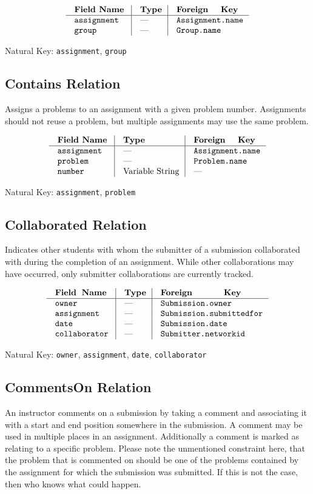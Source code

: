 $$\vbox{
  \offinterlineskip
  \halign{
    \strut \quad {\tt #}  & \vrule\quad #  & \vrule\quad # \cr
    {\bf Field Name}  & {\bf Type}  & {\bf Foreign Key}\cr
    \noalign{\hrule}    
    assignment  & ---  & {\tt Assignment.name} \cr
    group  & ---  & {\tt Group.name} \cr
  }
}$$

{\noindent
Natural Key: {\tt assignment}, {\tt group}\par}

\subsection{Contains Relation}
Assigns a problems to an assignment with a given problem number.
Assignments should not reuse a problem,
but multiple assignments may use the same problem.

$$\vbox{
  \offinterlineskip
  \halign{
    \strut \quad {\tt #}  & \vrule\quad #  & \vrule\quad # \cr
    {\bf Field Name}  & {\bf Type}  & {\bf Foreign Key}\cr
    \noalign{\hrule}    
    assignment  & ---  & {\tt Assignment.name} \cr
    problem  & ---  & {\tt Problem.name} \cr
    number  & Variable String  & --- \cr
  }
}$$

{\noindent
Natural Key: {\tt assignment}, {\tt problem}\par}

\subsection{Collaborated Relation}
Indicates other students with whom the submitter of a submission
collaborated with during the completion of an assignment.
While other collaborations may have occurred, only submitter 
collaborations are currently tracked.

$$\vbox{
  \offinterlineskip
  \halign{
    \strut \quad {\tt #}  & \vrule\quad #  & \vrule\quad # \cr
    {\bf Field Name}  & {\bf Type}  & {\bf Foreign Key}\cr
    \noalign{\hrule}   
    owner & --- & {\tt Submission.owner} \cr
    assignment & --- & {\tt Submission.submittedfor} \cr
    date & --- & {\tt Submission.date} \cr
    collaborator  & ---  & {\tt Submitter.networkid} \cr
  }
}$$

{\noindent
Natural Key: {\tt owner}, {\tt assignment}, {\tt date}, {\tt collaborator}\par}

\subsection{CommentsOn Relation}
An instructor comments on a submission by taking a comment 
and associating it with a start and end position somewhere in the submission. 
A comment may be used in multiple places in an assignment. 
Additionally a comment is marked as relating to a specific problem.
Please note the unmentioned constraint here, that the problem that is commented 
on should be one of the problems contained by the assignment for which the 
submission was submitted. If this is not the case, then who knows what could 
happen.

